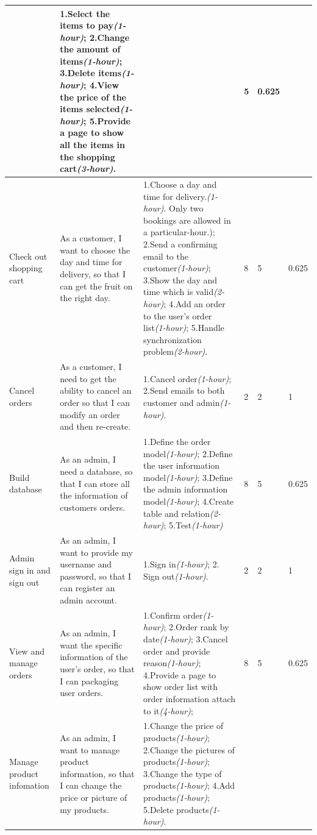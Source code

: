 \documentclass{report}
\begin{document}
\begin{tabularx}{0.95\linewidth}{%
  >{\raggedright\arraybackslash}p{1.5cm}%
  >{\raggedright\arraybackslash}X%
  >{\raggedright\arraybackslash}X%
  p{1cm}p{1cm}p{1cm}
  }
  & 1.Select the items to pay\textit{(1-hour)}; 2.Change the amount of items\textit{(1-hour)}; 3.Delete items\textit{(1-hour)}; 4.View the price of the items selected\textit{(1-hour)}; 5.Provide a page to show all the items in the shopping cart\textit{(3-hour)}.
  & 8
  & 5
  & 0.625
  \\
  \midrule
  Check out shopping cart
  & As a customer, I want to choose the day and time for delivery, so that I can get the fruit on the right day.
  & 1.Choose a day and time for delivery.\textit{(1-hour)}. Only two bookings are allowed in a particular-hour.); 2.Send a confirming email to the customer\textit{(1-hour)}; 3.Show the day and time which is valid\textit{(2-hour)}; 4.Add an order to the user's order list\textit{(1-hour)}; 5.Handle synchronization problem\textit{(2-hour)}.
  & 8
  & 5
  & 0.625
  \\
  \midrule
  Cancel orders
  & As a customer, I need to get the ability to cancel an order so that I can modify an order and then re-create.
  & 1.Cancel order\textit{(1-hour)}; 2.Send emails to both customer and admin\textit{(1-hour)}.
  & 2
  & 2
  & 1
  \\
  \midrule
  Build database
  & As an admin, I need a database, so that I can store all the information of customers orders.
  & 1.Define the order model\textit{(1-hour)}; 2.Define the user information model\textit{(1-hour)}; 3.Define the admin information model\textit{(1-hour)}; 4.Create table and relation\textit{(2-hour)}; 5.Test\textit{(1-hour)}
  & 8
  & 5
  & 0.625
  \\
  \midrule
  Admin sign in and sign out
  & As an admin, I want to provide my username and password, so that I can register an admin account.
  & 1.Sign in\textit{(1-hour)}; 2. Sign out\textit{(1-hour)}.
  & 2
  & 2
  & 1
  \\
  \midrule
  View and manage orders
  & As an admin, I want the specific information of the user's order, so that I can packaging user orders.
  & 1.Confirm order\textit{(1-hour)}; 2.Order rank by date\textit{(1-hour)}; 3.Cancel order and provide reason\textit{(1-hour)}; 4.Provide a page to show order list with order information attach to it\textit{(4-hour)};
  & 8
  & 5
  & 0.625
  \\
  \midrule
  Manage product infomation
  & As an admin, I want to manage product information, so that I can change the price or picture of my products.
  & 1.Change the price of products\textit{(1-hour)}; 2.Change the pictures of products\textit{(1-hour)}; 3.Change the type of products\textit{(1-hour)}; 4.Add products\textit{(1-hour)}; 5.Delete products\textit{(1-hour)}.

\end{tabularx}
\end{document}

